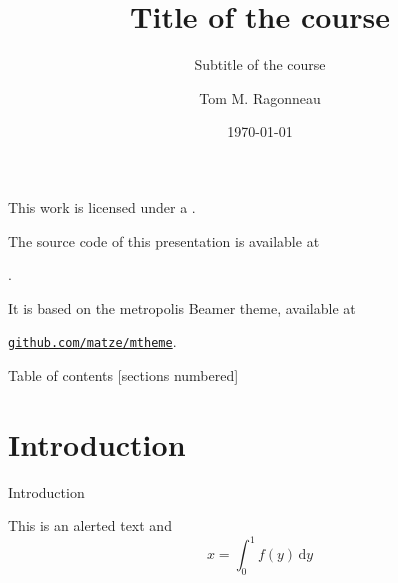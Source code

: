 \documentclass[10pt]{beamer}
\title{Title of the course}
\subtitle{Subtitle of the course}
\date{\today}
\author{Tom M. Ragonneau}
\institute{
    Department of Applied Mathematics\\ 
    The Hong Kong Polytechnic University
}
\begin{document}
\maketitle

\begin{frame}[standout]

    This work is licensed under a \doclicenseLongNameRef.
    \begin{center}
        \doclicenseImage[imagewidth=0.3\textwidth]
    \end{center}

    \bigskip

    The source code of this presentation is available at
    \begin{center}
        \normalfont\href{\giturl}{\texttt{\giturlshort}}.
    \end{center}

    It is based on the metropolis Beamer theme, available at
    \begin{center}
        \normalfont\href{https://github.com/matze/mtheme/}{\texttt{github.com/matze/mtheme}}.
    \end{center}
\end{frame}

\begin{frame}{Table of contents}
    [sections numbered]
    \tableofcontents[hideallsubsections]
\end{frame}

\section{Introduction}

\begin{frame}{Introduction}

  This is an \alert{alerted text} and
  \begin{equation}
    x = \int_0^1 f(y) \, \mathrm{d}y
  \end{equation}
\end{frame}

\appendix
\end{document}
